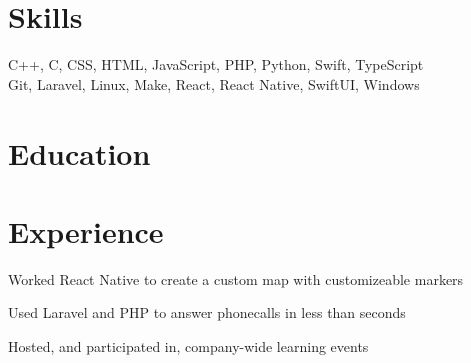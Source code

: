 \documentclass[]{deedy-resume-openfont}
\begin{document}
\hfill
\begin{minipage}[t]{0.95\textwidth}


\section{Skills}
C++, C, CSS, HTML, JavaScript, PHP, Python, Swift, TypeScript\\
Git, Laravel, Linux, Make, React, React Native, SwiftUI, Windows


\section{Education} 






\section{Experience}



\vspace{\topsep} %
\begin{tightemize}
\item Worked React Native to create a custom map with customizeable markers
\item Used Laravel and PHP to answer phonecalls in less than seconds
\item Hosted, and participated in, company-wide learning events
\end{tightemize}


\end{minipage}
\end{document}
